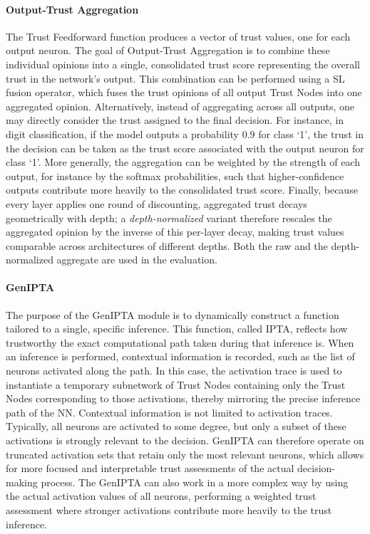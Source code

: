 \paragraph{Output-Trust Aggregation}
The Trust Feedforward function produces a vector of trust values, one for each output neuron. The goal of Output-Trust Aggregation is to combine these individual opinions into a single, consolidated trust score representing the overall trust in the network's output. This combination can be performed using a SL fusion operator, which fuses the trust opinions of all output Trust Nodes into one aggregated opinion. Alternatively, instead of aggregating across all outputs, one may directly consider the trust assigned to the final decision. For instance, in digit classification, if the model outputs a probability \(0.9\) for class ‘1’, the trust in the decision can be taken as the trust score associated with the output neuron for class ‘1’. More generally, the aggregation can be weighted by the strength of each output, for instance by the softmax probabilities, such that higher-confidence outputs contribute more heavily to the consolidated trust score. Finally, because every layer applies one round of discounting, aggregated trust decays geometrically with depth; a \emph{depth-normalized} variant therefore rescales the aggregated opinion by the inverse of this per-layer decay, making trust values comparable across architectures of different depths. Both the raw and the depth-normalized aggregate are used in the evaluation.

\paragraph{\acf{GenIPTA}}

The purpose of the \ac{GenIPTA} module is to dynamically construct a function tailored to a single, specific inference. This function, called \ac{IPTA}, reflects how trustworthy the exact computational path taken during that inference is. When an inference is performed, contextual information is recorded, such as the list of neurons activated along the path. In this case, the activation trace is used to instantiate a temporary subnetwork of Trust Nodes containing only the Trust Nodes corresponding to those activations, thereby mirroring the precise inference path of the \ac{NN}. Contextual information is not limited to activation traces. Typically, all neurons are activated to some degree, but only a subset of these activations is strongly relevant to the decision. \ac{GenIPTA} can therefore operate on truncated activation sets that retain only the most relevant neurons, which allows for more focused and interpretable trust assessments of the actual decision-making process. The \ac{GenIPTA} can also work in a more complex way by using the actual activation values of all neurons, performing a weighted trust assessment where stronger activations contribute more heavily to the trust inference.

